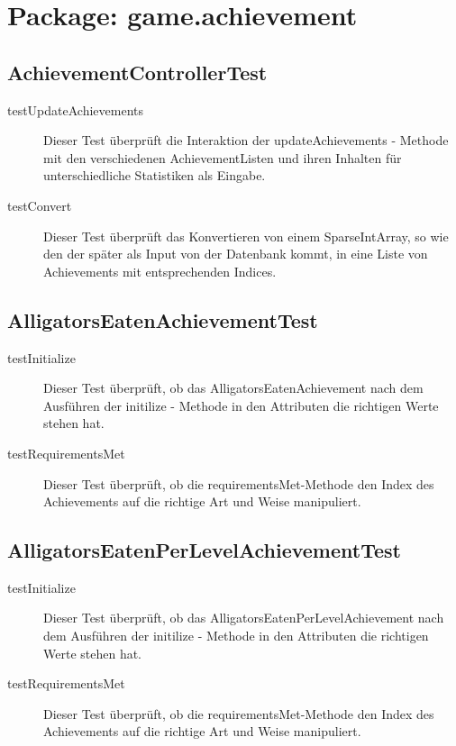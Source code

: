\section{Package: game.achievement}

\subsection{AchievementControllerTest}

\begin{description}

\item[testUpdateAchievements]
Dieser Test überprüft die Interaktion der updateAchievements - Methode mit den verschiedenen AchievementListen und ihren Inhalten für unterschiedliche Statistiken als Eingabe. 

\item[testConvert]
Dieser Test überprüft das Konvertieren von einem SparseIntArray, so wie den der später als Input von der Datenbank kommt, in eine Liste von Achievements mit entsprechenden Indices.

\end{description}

\subsection{AlligatorsEatenAchievementTest}

\begin{description}
\item[testInitialize]
Dieser Test überprüft, ob das AlligatorsEatenAchievement nach dem Ausführen der initilize - Methode in den Attributen die richtigen Werte stehen hat.

\item[testRequirementsMet]
Dieser Test überprüft, ob die requirementsMet-Methode den Index des Achievements auf die richtige Art und Weise manipuliert.

\end{description}

\subsection{AlligatorsEatenPerLevelAchievementTest}

\begin{description}
\item[testInitialize]
Dieser Test überprüft, ob das AlligatorsEatenPerLevelAchievement nach dem Ausführen der initilize - Methode in den Attributen die richtigen Werte stehen hat.

\item[testRequirementsMet]
Dieser Test überprüft, ob die requirementsMet-Methode den Index des Achievements auf die richtige Art und Weise manipuliert.

\end{description}

